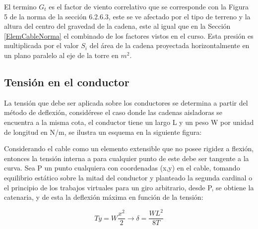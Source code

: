 El termino $G_t$ es el factor de viento correlativo que se corresponde con la Figura 5 de la norma de la sección 6.2.6.3, este se ve afectado por el tipo de terreno y la altura del centro del gravedad de la cadena, este al igual que en la Sección \ref{ElemCableNorma} el combinado de los factores vistos en el curso. Esta presión es multiplicada por el valor $S_i$ del área de la cadena proyectada horizontalmente en un plano paralelo al eje de la torre en $m^2$.


\subsection{Tensión en el conductor}\label{TensionConductor}
La tensión que debe ser aplicada sobre los conductores se determina a partir del método de deflexión, considérese el caso donde las cadenas aisladoras se encuentra a la misma cota, el conductor tiene un largo L y un peso W por unidad de longitud en N/m, se ilustra un esquema en la siguiente figura:


%


Considerando el cable como un elemento extensible que no posee rigidez a flexión,  entonces la tensión interna a para cualquier punto de este debe ser tangente a la curva. Sea P un punto cualquiera con coordenadas (x,y) en el cable, tomando equilibrio estático sobre la mitad del conductor y planteado la segunda cardinal o el principio de los trabajos virtuales para un giro arbitrario, desde P, se obtiene la catenaria, y de esta la deflexión máxima en función de la tensión:


\begin{equation}
	Ty=W\frac{x^{2}}{2} \rightarrow \delta= \frac{WL^{2}}{8T}
\end{equation}